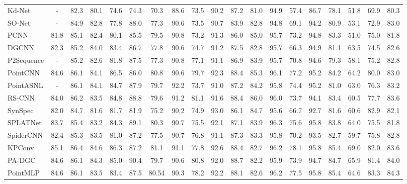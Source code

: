 \documentclass{article} \usepackage{iclr2022_conference,times}
\begin{document}
\begin{table*}[]
\begin{adjustbox}{width=1\textwidth}
\begin{tabular}{l|cc|cccccccccccccccc}
         Kd-Net&-&82.3 &80.1 &74.6  &74.3 &70.3 &88.6 &73.5 &90.2 &87.2 &81.0 &94.9 &57.4 &86.7 &78.1 &51.8 &69.9 &80.3 \\
         SO-Net&-&84.9 &82.8 &77.8 &88.0 &77.3 &90.6 &73.5 &90.7 &83.9 &82.8 &94.8 &69.1 &94.2 &80.9 &53.1 &72.9 &83.0 \\
         PCNN&81.8&85.1 &82.4 &80.1 &85.5 &79.5 &90.8 &73.2 &91.3 &86.0 &85.0 &95.7 &73.2 &94.8 &83.3 &51.0 &75.0 &81.8 \\
         DGCNN&82.3&85.2 &84.0 &83.4 &86.7 &77.8 &90.6 &74.7 &91.2 &87.5 &82.8 &95.7 &66.3 &94.9 &81.1 &63.5 &74.5 &82.6 \\
         P2Sequence&-&85.2 &82.6 &81.8 &87.5 &77.3 &90.8 &77.1 &91.1 &86.9 &83.9 &95.7 &70.8 &94.6 &79.3 &58.1 &75.2 &82.8 \\
         PointCNN&84.6&86.1&84.1 &86.5 &86.0 &80.8 &90.6 &79.7 &92.3 &88.4 &85.3 &96.1 &77.2 &95.2 &84.2 &64.2 &80.0 &83.0 \\
         PointASNL&-&86.1 &84.1 &84.7 &87.9 &79.7 &92.2 &73.7 &91.0 &87.2 &84.2 &95.8 &74.4 &95.2 &81.0 &63.0 &76.3 &83.2 \\
         RS-CNN&84.0&86.2 &83.5 &84.8 &88.8 &79.6 &91.2 &81.1 &91.6 &88.4 &86.0 &96.0 &73.7 &94.1 &83.4 &60.5 &77.7 &83.6 \\
         SynSpec&82.0&84.7 &81.6 &81.7 &81.9 &75.2 &90.2 &74.9 &93.0 &86.1 &84.7 &95.6 &66.7 &92.7 &81.6 &60.6 &82.9 &82.1 \\
         SPLATNet&83.7&85.4&83.2 &84.3 &89.1 &80.3 &90.7 &75.5 &92.1 &87.1 &83.9 &96.3 &75.6 &95.8 &83.8 &64.0 &75.5 &81.8 \\
         SpiderCNN&82.4&85.3 &83.5 &81.0 &87.2 &77.5 &90.7 &76.8 &91.1 &87.3 &83.3 &95.8 &70.2 &93.5 &82.7 &59.7 &75.8 &82.8 \\
         KPConv&85.1&86.4 &84.6 &86.3 &87.2 &81.1 &91.1 &77.8 &92.6 &88.4 &82.7 &96.2 &78.1 &95.8 &85.4 &69.0 &82.0 &83.6 \\
         PA-DGC&84.6&86.1 &84.3 &85.0 &90.4 &79.7 &90.6 &80.8 &92.0 &88.7 &82.2 &95.9 &73.9 &94.7 &84.7 &65.9 &81.4 &84.0 \\
         \midrule
        PointMLP&84.6  &86.1  &83.5  &83.4 &87.5 &80.54  &90.3 &78.2 &92.2  & 88.1 &82.6  & 96.2  &77.5  &95.8  &85.4  &64.6  & 83.3 &84.3 \\
         \bottomrule
    \end{tabular}
    \end{adjustbox}
\end{table*}
\end{document}
